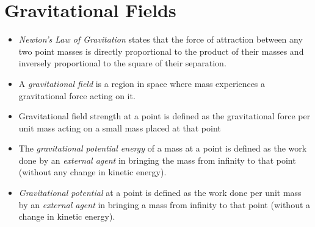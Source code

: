 \documentclass[oneside]{book}
\begin{document}
\chapter{Gravitational Fields}
\begin{itemize}
    \item \textit{Newton's Law of Gravitation} states that the force of attraction between any two point masses is directly proportional to the product of their masses and inversely proportional to the square of their separation.
    \item A \textit{gravitational field} is a region in space where mass experiences a gravitational force acting on it.
    \item Gravitational field strength at a point is defined as the gravitational force per unit mass acting on a small mass placed at that point
    \item The \textit{gravitational potential energy} of a mass at a point is defined as the work done by an \emph{external agent} in bringing the mass from infinity to that point (without any change in kinetic energy).
    \item \textit{Gravitational potential} at a point is defined as the work done per unit mass by an \emph{external agent} in bringing a mass from infinity to that point (without a change in kinetic energy).
\end{itemize}
\end{document}
